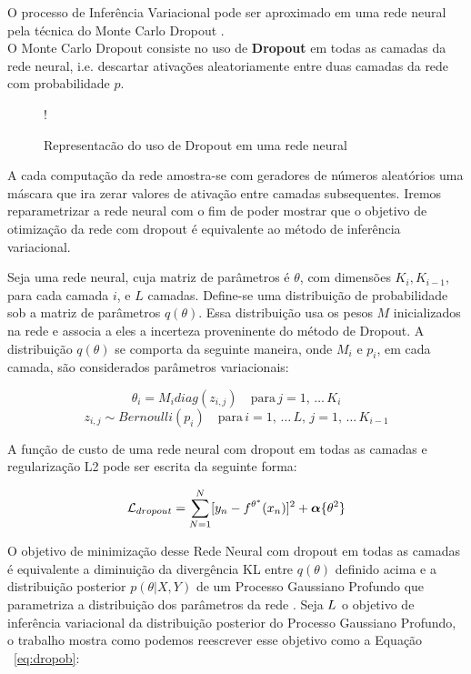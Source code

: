 O processo de Inferência Variacional pode ser aproximado em uma rede neural pela técnica do Monte Carlo Dropout \citep{dropbayes}. \\

O Monte Carlo Dropout consiste no uso de \textbf{Dropout} em todas as camadas da rede
neural, i.e. descartar ativações aleatoriamente entre duas camadas da rede com
probabilidade $p$.\\

\begin{figure}
  \centering
  \resizebox {\columnwidth} {!} {}
  \label{fig:dropout}
  \caption{Representacão do uso de Dropout em uma rede neural}
\end{figure}


A cada computação da rede amostra-se com geradores de números aleatórios uma
máscara que ira zerar valores de ativação entre camadas subsequentes. Iremos
reparametrizar a rede neural com o fim de poder mostrar que o objetivo de
otimização da rede com dropout é equivalente ao método de inferência variacional.

Seja uma rede neural, cuja matriz de parâmetros é $\theta$, com dimensões
$K_i,K_{i-1}$, para cada camada $i$, e $L$ camadas. Define-se uma distribuição
de probabilidade sob a matriz de parâmetros $q(\theta)$.
Essa distribuição usa os pesos $M$ inicializados na rede e associa a eles a incerteza proveninente do
método de Dropout. A distribuição $q(\theta)$ se comporta da seguinte maneira,
onde $M_i$ e $p_i$, em cada camada, são considerados parâmetros variacionais:

\newcommand{\diag}{\mathop{\mathrm{diag}}}

\[
  \theta_i   = M_i   diag (z_{i,j}) \quad \text{para} \, j=1, \, \dots  \,K_i
\] 
\[
  z_{i,j}  \sim Bernoulli(p_i) \quad  \text{para} \, i=1, \, \dots \, L, \, j=1, \, \dots \, K_{i-1}
\]   


A função de custo de uma rede neural com dropout em todas as camadas  e
regularização L2 pode ser escrita da seguinte forma:

\begin{equation}
  \mathcal{L}_{dropout} = \sum^N_{N=1} [y_n - \mathnormal{f}^{\theta^*}(x_n)]^2
  + \boldsymbol{\alpha}\{\theta^2\}
\label{eq:dropob}
\end{equation}


O objetivo de minimização desse Rede Neural com dropout em todas as camadas é
equivalente a diminuição da divergência KL entre $q(\theta)$ definido acima e a distribuição
posterior $p(\theta | X,Y)$ de um Processo Gaussiano Profundo que parametriza a
distribuição dos parâmetros da rede \citep{dropbayes}. Seja $\mathnormal{L}$ o
objetivo de inferência variacional da distribuição posterior do Processo Gaussiano Profundo, o trabalho
\citep{dropbayes} mostra como podemos reescrever esse objetivo como a Equação ~\ref{eq:dropob}:

